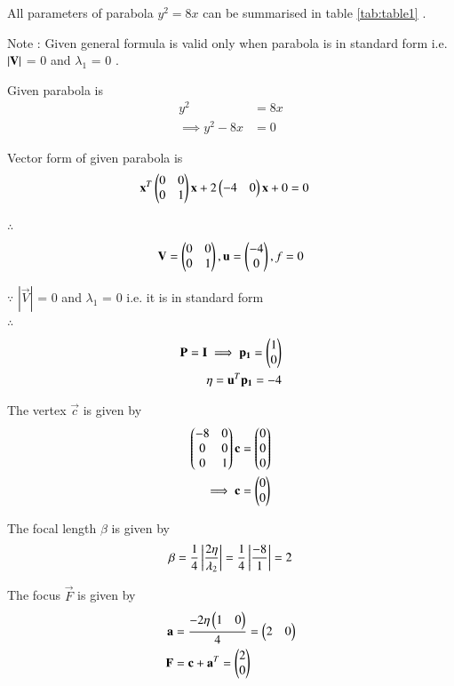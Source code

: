 \documentclass[journal,12pt,twocolumn]{IEEEtran}
\begin{document}
All parameters of parabola $y^2=8x$ can be summarised in table \ref{tab:table1} .

Note : Given general formula is valid only when parabola is in standard form i.e. $\left\vert\mathbf{V}\right\vert$ = 0 and $\lambda_1$ = 0 . 

Given parabola is 
\begin{align}
y^2 &= 8x
\\
\implies y^2 - 8x &= 0
\end{align}

Vector form of given parabola is
\begin{align}
\mathbf{x}^T\begin{pmatrix}0 & 0 \\ 0 & 1\end{pmatrix}\mathbf{x} + 2\begin{pmatrix}-4 & 0\end{pmatrix}\mathbf{x} + 0 &= 0 
\end{align}

$\therefore$
\begin{align}
 \mathbf{V} = \begin{pmatrix}0 & 0 \\ 0 & 1\end{pmatrix} ,
 \mathbf{u} = \begin{pmatrix}-4\\0\end{pmatrix} ,
 f = 0
\end{align}

$\because$
$|\vec{V}|$ = 0 and $\lambda_1$ = 0 i.e. it is in standard form
\\
$\therefore$
\begin{align}
\mathbf{P}=\mathbf{I} \implies \mathbf{p_1} = \begin{pmatrix}1\\0\end{pmatrix}
\\
\eta = \mathbf{u}^T\mathbf{p_1} = -4
\end{align}

The vertex $\vec{c}$ is given by
\begin{align}
\begin{pmatrix}-8 & 0\\0 & 0\\0 & 1\end{pmatrix}\mathbf{c} &= \begin{pmatrix}0\\0\\0\end{pmatrix}
\\
\implies \mathbf{c} &= \begin{pmatrix}0\\0\end{pmatrix}
\end{align}

The focal length $\beta$ is given by
\begin{align}
\beta = \frac{1}{4}\left\vert\frac{2\eta}{\lambda_2}\right\vert = \frac{1}{4}\left\vert\frac{-8}{1}\right\vert= 2
\end{align}

The focus $\vec{F}$ is given by
\begin{align}
\mathbf{a} &= \frac{-2\eta\begin{pmatrix}1 & 0\end{pmatrix}}{4} = \begin{pmatrix}2 & 0\end{pmatrix}
\\
\mathbf{F} &= \mathbf{c} + \mathbf{a}^T = \begin{pmatrix}2\\0\end{pmatrix}
\end{align}
\end{document}
